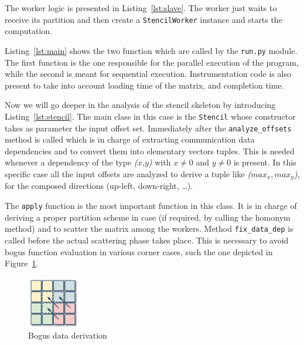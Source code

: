 

The worker logic is presented in Listing~\ref{lst:slave}. The worker
just waits to receive its partition and then create a
\texttt{StencilWorker} instance and starts the computation.



Listing~\ref{lst:main} shows the two function which are called by the
\texttt{run.py} module. The first function is the one responsible for
the parallel execution of the program, while the second is meant for
sequential execution. Instrumentation code is also present to take into
account loading time of the matrix, and completion time.



Now we will go deeper in the analysis of the stencil skeleton by
introducing Listing~\ref{lst:stencil}. The main class in this case is
the \texttt{Stencil} whose constructor takes as parameter the input
offset set. Immediately after the \texttt{analyze\_offsets} method is
called which is in charge of extracting communication data dependencies
and to convert them into elementary vectors tuples. This is needed
whenever a dependency of the type \emph{($x$,$y$)} with $x \ne 0$ and $y
\ne 0$ is present. In this specific case all the input offsets are
analyzed to derive a tuple like \emph{($max_{x}, max_{y}$)}, for the
composed directions (\eg up-left, down-right, \ldots).

The \texttt{apply} function is the most important function in this
class. It is in charge of deriving a proper partition scheme in case (if
required, by calling the homonym method) and to scatter the matrix among
the workers. Method \texttt{fix\_data\_dep} is called before the actual
scattering phase takes place. This is necessary to avoid bogus
function evaluation in various corner cases, such the one depicted in
Figure~\ref{fig:corner}.

\begin{figure}[!h]
  \centering
  \includegraphics[width=0.2\textwidth]{imgs/corner.png}
  \caption{Bogus data derivation}
  \label{fig:corner}
\end{figure}

